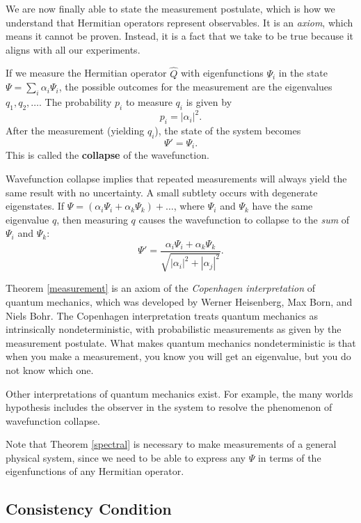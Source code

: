 We are now finally able to state the measurement postulate, which is how we understand that Hermitian operators represent observables. It is an \textit{axiom}, which means it cannot be proven. Instead, it is a fact that we take to be true because it aligns with all our experiments.

\begin{framedthm}\label{measurement}
   If we measure the Hermitian operator $\hat{Q}$ with eigenfunctions $\Psi_i$ in the state $\Psi=\sum_i\alpha_i\Psi_i$, the possible outcomes for the measurement are the eigenvalues $q_1,q_2,\ldots$. The probability $p_i$ to measure $q_i$ is given by $$p_i=|\alpha_i|^2.$$After the measurement (yielding $q_i$), the state of the system becomes $$\Psi'=\Psi_i.$$This is called the \textbf{collapse} of the wavefunction. 
\end{framedthm} 

Wavefunction collapse implies that repeated measurements will always yield the same result with no uncertainty. A small subtlety occurs with degenerate eigenstates. If $\Psi=(\alpha_i\Psi_i+\alpha_k\Psi_k)+\ldots$, where $\Psi_i$ and $\Psi_k$ have the same eigenvalue $q$, then measuring $q$ causes the wavefunction to collapse to the \textit{sum} of $\Psi_i$ and $\Psi_k$:$$\Psi'=\frac{\alpha_i\Psi_i+\alpha_k\Psi_k}{\sqrt{|\alpha_i|^2+|\alpha_j|^2}}.$$

\begin{framedrmk*}
    Theorem \ref{measurement} is an axiom of the \textit{Copenhagen interpretation} of quantum mechanics, which was developed by Werner Heisenberg, Max Born, and Niels Bohr. The Copenhagen interpretation treats quantum mechanics as intrinsically nondeterministic, with probabilistic measurements as given by the measurement postulate. What makes quantum mechanics nondeterministic is that when you make a measurement, you know you will get an eigenvalue, but you do not know which one.

    Other interpretations of quantum mechanics exist. For example, the many worlds hypothesis includes the observer in the system to resolve the phenomenon of wavefunction collapse.
\end{framedrmk*}

Note that Theorem \ref{spectral} is necessary to make measurements of a general physical system, since we need to be able to express any $\Psi$ in terms of the eigenfunctions of any Hermitian operator.

\subsection{Consistency Condition}\label{consistency}

